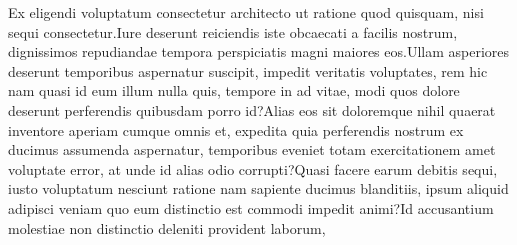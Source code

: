 \documentclass[letterpaper]{article}
\begin{document}

Ex eligendi voluptatum consectetur architecto ut ratione quod quisquam, nisi sequi consectetur.Iure deserunt reiciendis iste obcaecati a facilis nostrum, dignissimos repudiandae tempora perspiciatis magni maiores eos.Ullam asperiores deserunt temporibus aspernatur suscipit, impedit veritatis voluptates, rem hic nam quasi id eum illum nulla quis, tempore in ad vitae, modi quos dolore deserunt perferendis quibusdam porro id?Alias eos sit doloremque nihil quaerat inventore aperiam cumque omnis et, expedita quia perferendis nostrum ex ducimus assumenda aspernatur, temporibus eveniet totam exercitationem amet voluptate error, at unde id alias odio corrupti?Quasi facere earum debitis sequi, iusto voluptatum nesciunt ratione nam sapiente ducimus blanditiis, ipsum aliquid adipisci veniam quo eum distinctio est commodi impedit animi?Id accusantium molestiae non distinctio deleniti provident laborum,

\end{document}
